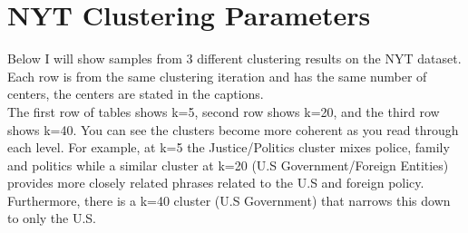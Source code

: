 \documentclass{article}
\begin{document}
\section*{NYT Clustering Parameters}
Below I will show samples from 3 different clustering results on the NYT dataset.  Each row is from the same clustering iteration and has the same number of centers, the centers are stated in the captions.\\
The first row of tables shows k=5, second row shows k=20, and the third row shows k=40.  You can see the clusters become more coherent as you read through each level.  For example, at k=5 the Justice/Politics cluster mixes police, family and politics while a similar cluster at k=20 (U.S Government/Foreign Entities) provides more closely related phrases related to the U.S and foreign policy. Furthermore, there is a k=40 cluster (U.S Government) that narrows this down to only the U.S.
\end{document}
